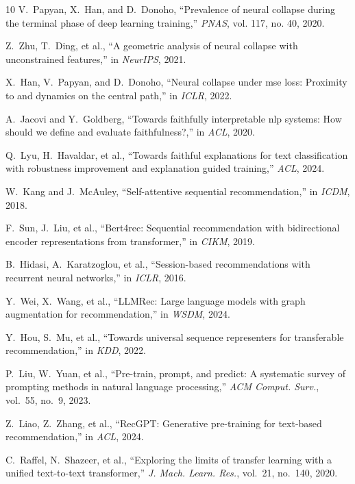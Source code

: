\documentclass[lettersize,journal]{IEEEtran}
\begin{document}
\begin{thebibliography}{10}
V.~Papyan, X.~Han, and D.~Donoho, ``Prevalence of neural collapse during the terminal phase of deep learning training,'' \emph{PNAS}, vol. 117, no. 40, 2020.

Z.~Zhu, T.~Ding, et al., ``A geometric analysis of neural collapse with unconstrained features,'' in \emph{NeurIPS}, 2021.

X.~Han, V.~Papyan, and D.~Donoho, ``Neural collapse under mse loss: Proximity to and dynamics on the central path,'' in \emph{ICLR}, 2022.

A.~Jacovi and Y.~Goldberg, ``Towards faithfully interpretable nlp systems: How should we define and evaluate faithfulness?,'' in \emph{ACL}, 2020.

Q.~Lyu, H.~Havaldar, et al., ``Towards faithful explanations for text classification with robustness improvement and explanation guided training,'' \emph{ACL}, 2024.

W.~Kang and J.~McAuley, ``Self-attentive sequential recommendation,'' in \emph{ICDM}, 2018.

F.~Sun, J.~Liu, et al., ``Bert4rec: Sequential recommendation with bidirectional encoder representations from transformer,'' in \emph{CIKM}, 2019.

B.~Hidasi, A.~Karatzoglou, et al., ``Session-based recommendations with recurrent neural networks,'' in \emph{ICLR}, 2016.

Y.~Wei, X.~Wang, et al., ``LLMRec: Large language models with graph augmentation for recommendation,'' in \emph{WSDM}, 2024.

Y.~Hou, S.~Mu, et al., ``Towards universal sequence representers for transferable recommendation,'' in \emph{KDD}, 2022.

P.~Liu, W.~Yuan, et al., ``Pre-train, prompt, and predict: A systematic survey of prompting methods in natural language processing,'' \emph{ACM Comput. Surv.}, vol.~55, no.~9, 2023.

Z.~Liao, Z.~Zhang, et al., ``RecGPT: Generative pre-training for text-based recommendation,'' in \emph{ACL}, 2024.

C.~Raffel, N.~Shazeer, et al., ``Exploring the limits of transfer learning with a unified text-to-text transformer,'' \emph{J. Mach. Learn. Res.}, vol.~21, no.~140, 2020.


\end{thebibliography}
\end{document}
